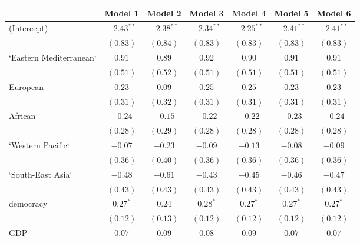 
\begin{table}[!h]
\begin{center}
\begin{tabular}{l c c c c c c }
\toprule
 & Model 1 & Model 2 & Model 3 & Model 4 & Model 5 & Model 6 \\
\midrule
(Intercept)             & $-2.43^{**}$ & $-2.38^{**}$ & $-2.34^{**}$ & $-2.25^{**}$ & $-2.41^{**}$ & $-2.41^{**}$ \\
                        & $(0.83)$     & $(0.84)$     & $(0.83)$     & $(0.83)$     & $(0.83)$     & $(0.83)$     \\
`Eastern Mediterranean` & $0.91$       & $0.89$       & $0.92$       & $0.90$       & $0.91$       & $0.91$       \\
                        & $(0.51)$     & $(0.52)$     & $(0.51)$     & $(0.51)$     & $(0.51)$     & $(0.51)$     \\
European                & $0.23$       & $0.09$       & $0.25$       & $0.25$       & $0.23$       & $0.23$       \\
                        & $(0.31)$     & $(0.32)$     & $(0.31)$     & $(0.31)$     & $(0.31)$     & $(0.31)$     \\
African                 & $-0.24$      & $-0.15$      & $-0.22$      & $-0.22$      & $-0.23$      & $-0.24$      \\
                        & $(0.28)$     & $(0.29)$     & $(0.28)$     & $(0.28)$     & $(0.28)$     & $(0.28)$     \\
`Western Pacific`       & $-0.07$      & $-0.23$      & $-0.09$      & $-0.13$      & $-0.08$      & $-0.09$      \\
                        & $(0.36)$     & $(0.40)$     & $(0.36)$     & $(0.36)$     & $(0.36)$     & $(0.36)$     \\
`South-East Asia`       & $-0.48$      & $-0.61$      & $-0.43$      & $-0.45$      & $-0.46$      & $-0.47$      \\
                        & $(0.43)$     & $(0.43)$     & $(0.43)$     & $(0.43)$     & $(0.43)$     & $(0.43)$     \\
democracy               & $0.27^{*}$   & $0.24$       & $0.28^{*}$   & $0.27^{*}$   & $0.27^{*}$   & $0.27^{*}$   \\
                        & $(0.12)$     & $(0.13)$     & $(0.12)$     & $(0.12)$     & $(0.12)$     & $(0.12)$     \\
GDP                     & $0.07$       & $0.09$       & $0.08$       & $0.09$       & $0.07$       & $0.07$       \\

\end{tabular}
\end{center}
\end{table}

